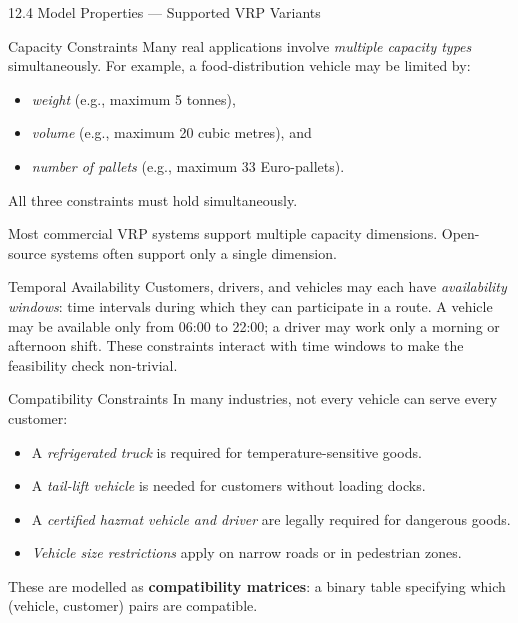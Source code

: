 \documentclass[aspectratio=169,10pt]{beamer}
\begin{document}
\begin{frame}[allowframebreaks]{12.4 \; Model Properties --- Supported VRP Variants}
\begin{block}{Capacity Constraints}
    Many real applications involve \emph{multiple capacity types}
    simultaneously.
    For example, a food-distribution vehicle may be limited by:
    \begin{itemize}
      \item \emph{weight} (e.g., maximum 5 tonnes),
      \item \emph{volume} (e.g., maximum 20 cubic metres), and
      \item \emph{number of pallets} (e.g., maximum 33 Euro-pallets).
    \end{itemize}
    All three constraints must hold simultaneously.

    Most commercial VRP systems support multiple capacity dimensions.
    Open-source systems often support only a single dimension.
  \end{block}

  \begin{block}{Temporal Availability}
    Customers, drivers, and vehicles may each have \emph{availability windows}:
    time intervals during which they can participate in a route.
    A vehicle may be available only from 06:00 to 22:00;
    a driver may work only a morning or afternoon shift.
    These constraints interact with time windows to make the feasibility
    check non-trivial.
  \end{block}

  \framebreak

  \begin{block}{Compatibility Constraints}
    In many industries, not every vehicle can serve every customer:
    \begin{itemize}
      \item A \emph{refrigerated truck} is required for temperature-sensitive goods.
      \item A \emph{tail-lift vehicle} is needed for customers without
            loading docks.
      \item A \emph{certified hazmat vehicle and driver} are legally required
            for dangerous goods.
      \item \emph{Vehicle size restrictions} apply on narrow roads or in
            pedestrian zones.
    \end{itemize}
    These are modelled as \textbf{compatibility matrices}: a binary table
    specifying which (vehicle, customer) pairs are compatible.
  \end{block}


\end{frame}
\end{document}
